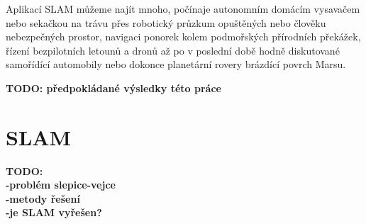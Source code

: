 \documentclass[12pt,a4paper]{article}
\begin{document}
Aplikací SLAM můžeme najít mnoho, počínaje autonomním domácím vysavačem nebo sekačkou na trávu přes robotický průzkum opuštěných nebo člověku nebezpečných prostor, navigaci ponorek kolem podmořských přírodních překážek, řízení bezpilotních letounů a dronů až po v poslední době hodně diskutované samořídící automobily nebo dokonce planetární rovery brázdící povrch Marsu.

\textbf{TODO: předpokládané výsledky této práce}

\newpage
\section{SLAM}
\textbf{TODO: \\
-problém slepice-vejce \\
-metody řešení \\
-je SLAM vyřešen?}
\end{document}
